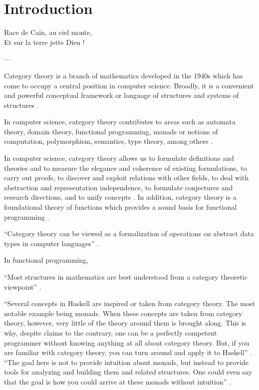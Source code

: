\chapter{Introduction}
\label{chap:introduction}

\epigraph{
  Race de Caïn, au ciel monte,\\
  Et sur la terre jette Dieu !
}{---\textcite[16]{baudelaire-1857}}

Category theory is a branch of mathematics developed in the 1940s
which has come to occupy a central position in computer science.
Broadly, it is a convenient and powerful conceptual framework or
language of structures and systems of structures
\parencites[vii]{maclane-1998}[1]{marquis-2013}[1154]{wolfram-2002}.

In computer science, category theory contributes to areas such as
automata theory, domain theory, functional programming, monads or
notions of computation, polymorphism, semantics, type theory, among
others
\parencites[23]{marquis-2013}{nlab-category-theory}[xi]{pierce-1991}[415]{poigne-1992}.

In computer science, category theory allows us to formulate
definitions and theories and to measure the elegance and coherence of
existing formulations, to carry out proofs, to discover and exploit
relations with other fields, to deal with abstraction and
representation independence, to formulate conjectures and research
directions, and to unify concepts \parencites[49--50]{goguen-1991}. In
addition, category theory is a foundational theory of functions which
provides a sound basis for functional programming
\parencite[414]{poigne-1992}.

``Category theory can be viewed as a formalization of operations on
abstract data types in computer languages''
\parencite[1154]{wolfram-2002}.






In functional programming,

``Most structures in mathematics are best understood from a category
theoretic viewpoint'' \parencite{nlab-category-theory}.

``Several concepts in Haskell are inspired or taken from category
theory. The most notable example being monads. When these concepts are
taken from category theory, however, very little of the theory around
them is brought along. This is why, despite claims to the contrary,
one can be a perfectly competent programmer without knowing anything
at all about category theory. But, if you are familiar with category
theory, you can turn around and apply it to Haskell''
\parencite[73]{elkins-2009}. ``The goal here is not to provide
intuition about monads, but instead to provide tools for analyzing and
building them and related structures. One could even say that the goal
is how you could arrive at these monads without intuition''
\parencite[73]{elkins-2009}.

